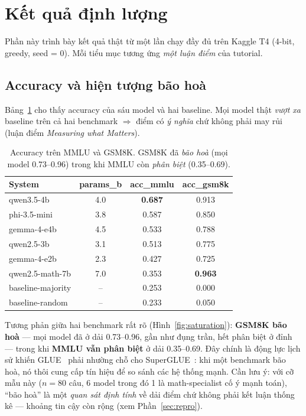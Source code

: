 \section{Kết quả định lượng}
\label{sec:results}

Phần này trình bày kết quả thật từ một lần chạy đầy đủ trên Kaggle T4 (4-bit,
greedy, seed = 0). Mỗi tiểu mục tương ứng \emph{một luận điểm} của tutorial.

\subsection{Accuracy và hiện tượng bão hoà}

Bảng~\ref{tab:accuracy} cho thấy accuracy của sáu model và hai baseline. Mọi model
thật \emph{vượt xa} baseline trên cả hai benchmark $\Rightarrow$ điểm có \emph{ý
nghĩa} chứ không phải may rủi (luận điểm \emph{Measuring what Matters}).

\begin{table}[t]
\centering
\caption{Accuracy trên MMLU và GSM8K. GSM8K đã \emph{bão hoà} (mọi model
0.73--0.96) trong khi MMLU còn \emph{phân biệt} (0.35--0.69).}
\label{tab:accuracy}
\small
\begin{tabular}{lccc}
\hline
\textbf{System} & \textbf{params\_b} & \textbf{acc\_mmlu} & \textbf{acc\_gsm8k} \\
\hline
qwen3.5-4b        & 4.0 & \textbf{0.687} & 0.913 \\
phi-3.5-mini      & 3.8 & 0.587 & 0.850 \\
gemma-4-e4b       & 4.5 & 0.533 & 0.788 \\
qwen2.5-3b        & 3.1 & 0.513 & 0.775 \\
gemma-4-e2b       & 2.3 & 0.427 & 0.725 \\
qwen2.5-math-7b   & 7.0 & 0.353 & \textbf{0.963} \\
\hline
baseline-majority & --  & 0.253 & 0.000 \\
baseline-random   & --  & 0.233 & 0.050 \\
\hline
\end{tabular}
\end{table}

Tương phản giữa hai benchmark rất rõ (Hình~\ref{fig:saturation}): \textbf{GSM8K bão
hoà} --- mọi model đã ở dải 0.73--0.96, gần như đụng trần, hết phân biệt ở đỉnh ---
trong khi \textbf{MMLU vẫn phân biệt} ở dải 0.35--0.69. Đây chính là động lực lịch
sử khiến GLUE~\cite{glue} phải nhường chỗ cho SuperGLUE~\cite{superglue}: khi một
benchmark bão hoà, nó thôi cung cấp tín hiệu để so sánh các hệ thống mạnh. Cần lưu
ý: với cỡ mẫu này ($n = 80$ câu, 6 model trong đó 1 là math-specialist cố ý mạnh
toán), ``bão hoà'' là một \emph{quan sát định tính} về dải điểm chứ không phải kết
luận thống kê --- khoảng tin cậy còn rộng (xem Phần~\ref{sec:repro}).

